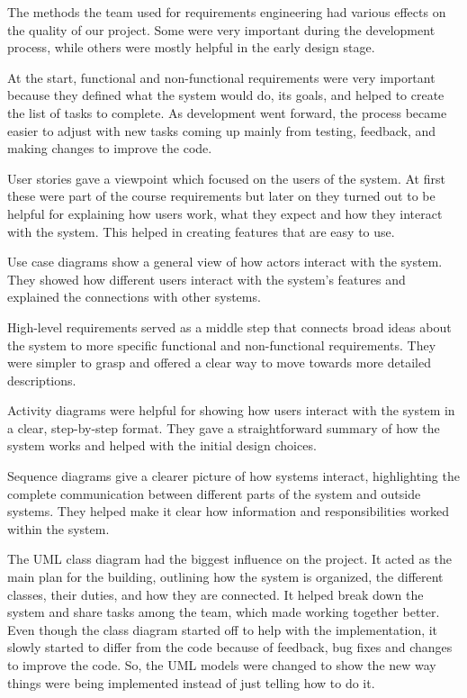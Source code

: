 The methods the team used for requirements engineering had various effects on the quality of our project. Some were very important during the development process, while others were mostly helpful in the early design stage.\par
At the start, functional and non-functional requirements were very important because they defined what the system would do, its goals, and helped to create the list of tasks to complete. As development went forward, the process became easier to adjust with new tasks coming up mainly from testing, feedback, and making changes to improve the code.\par
User stories gave a viewpoint which focused on the users of the system. At first these were part of the course requirements but later on they turned out to be helpful for explaining how users work, what they expect and how they interact with the system. This helped in creating features that are easy to use.\par
Use case diagrams show a general view of how actors interact with the system. They showed how different users interact with the system's features and explained the connections with other systems.\par
High-level requirements served as a middle step that connects broad ideas about the system to more specific functional and non-functional requirements. They were simpler to grasp and offered a clear way to move towards more detailed descriptions.\par
Activity diagrams were helpful for showing how users interact with the system in a clear, step-by-step format. They gave a straightforward summary of how the system works and helped with the initial design choices.\par

Sequence diagrams give a clearer picture of how systems interact, highlighting the complete communication between different parts of the system and outside systems. They helped make it clear how information and responsibilities worked within the system.\par

The UML class diagram had the biggest influence on the project. It acted as the main plan for the building, outlining how the system is organized, the different classes, their duties, and how they are connected. It helped break down the system and share tasks among the team, which made working together better. Even though the class diagram started off to help with the implementation, it slowly started to differ from the code because of feedback, bug fixes and changes to improve the code. So, the UML models were changed to show the new way things were being implemented instead of just telling how to do it.\par


